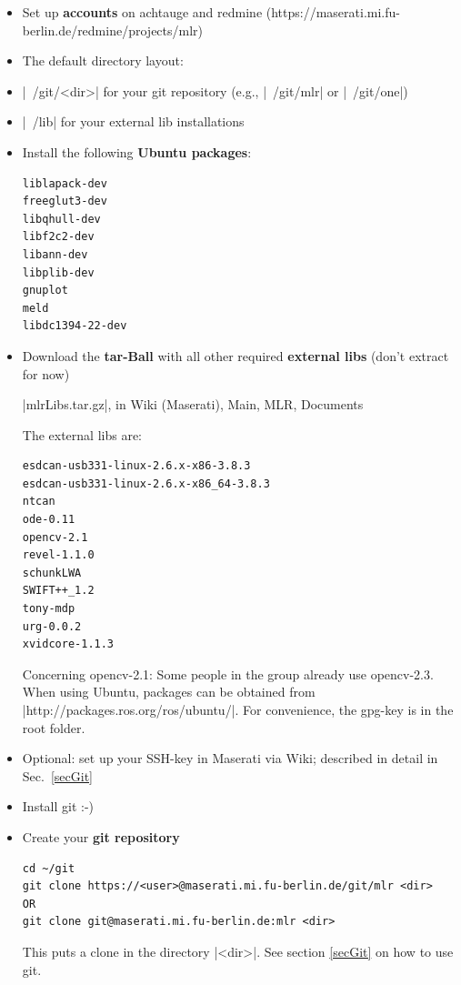 \begin{itemize}
\item Set up \textbf{accounts} on achtauge and redmine
   (https://maserati.mi.fu-berlin.de/redmine/projects/mlr)

\item The default directory layout:
\bi
\item |~/git/<dir>| for your git repository (e.g., |~/git/mlr| or
|~/git/one|)
\item |~/lib| for your external lib installations
\ei

\item Install the following \textbf{Ubuntu packages}:
\begin{code}
\begin{verbatim}
liblapack-dev
freeglut3-dev
libqhull-dev
libf2c2-dev
libann-dev
libplib-dev
gnuplot
meld
libdc1394-22-dev
\end{verbatim}
\end{code}


\item Download the \textbf{tar-Ball} with all other required
\textbf{external libs} (don't extract for now)

|mlrLibs.tar.gz|, in Wiki (Maserati), Main, MLR, Documents

The external libs are:
\begin{code}
\begin{verbatim}
esdcan-usb331-linux-2.6.x-x86-3.8.3
esdcan-usb331-linux-2.6.x-x86_64-3.8.3
ntcan
ode-0.11
opencv-2.1
revel-1.1.0
schunkLWA
SWIFT++_1.2
tony-mdp
urg-0.0.2
xvidcore-1.1.3
\end{verbatim}
\end{code}
Concerning opencv-2.1: Some people in the group already use opencv-2.3.
When using Ubuntu, packages can be obtained from
|http://packages.ros.org/ros/ubuntu/|. For convenience, the gpg-key
is in the root folder.


\item Optional: set up your SSH-key in Maserati via Wiki; described in
detail in Sec.~\ref{secGit}


\item Install git :-)


\item Create your \textbf{git repository}
\begin{code}
\begin{verbatim}
cd ~/git
git clone https://<user>@maserati.mi.fu-berlin.de/git/mlr <dir>
OR
git clone git@maserati.mi.fu-berlin.de:mlr <dir>
\end{verbatim}
\end{code}
This puts a clone in the directory |<dir>|. See section \ref{secGit} on
how to use git.



\end{itemize}
